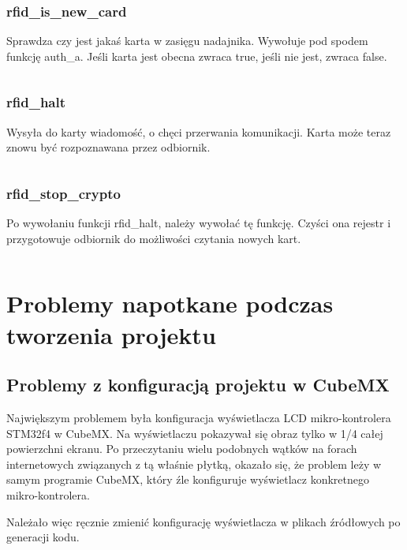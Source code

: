\documentclass[12pt,hidelinks]{article}
\begin{document}
    \subsubsection{rfid\_is\_new\_card}
    Sprawdza czy jest jakaś karta w zasięgu nadajnika. Wywołuje pod spodem funkcję auth\_a. Jeśli karta jest obecna zwraca true, jeśli nie jest, zwraca false.
    \inputminted[linenos=true]{c++}{rfid_code/rfid_is_new_card.c}

    \subsubsection{rfid\_halt}
    Wysyła do karty wiadomość, o chęci przerwania komunikacji. Karta może teraz znowu być rozpoznawana przez odbiornik.
    \inputminted[linenos=true]{c++}{rfid_code/rfid_halt.c}

    \subsubsection{rfid\_stop\_crypto}
    Po wywołaniu funkcji rfid\_halt, należy wywołać tę funkcję. Czyści ona rejestr i przygotowuje odbiornik do możliwości czytania nowych kart.
    \inputminted[linenos=true]{c++}{rfid_code/rfid_stop_crypto.c}


    \section{Problemy napotkane podczas tworzenia projektu}
    \vspace{10.5cm}

    \subsection{Problemy z konfiguracją projektu w CubeMX}
    Największym problemem była konfiguracja wyświetlacza LCD mikro-kontrolera STM32f4 w CubeMX. Na wyświetlaczu pokazywał się obraz tylko w 1/4 całej powierzchni ekranu. Po przeczytaniu wielu podobnych wątków na forach internetowych związanych z tą właśnie płytką, okazało się, że problem leży w samym programie CubeMX, który źle konfiguruje wyświetlacz konkretnego mikro-kontrolera.
    
    \vskip 0.2in
    Należało więc ręcznie zmienić konfigurację wyświetlacza w plikach źródłowych po generacji kodu. 
\end{document}

